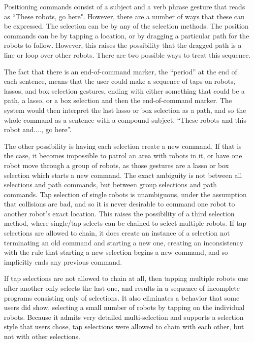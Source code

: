 Positioning commands consist of a subject and a verb phrase gesture that reads as ``These robots, go here". 
However, there are a number of ways that these can be expressed. 
The selection can be by any of the selection methods. 
The position commands can be by tapping a location, or by dragging a particular path for the robots to follow. 
However, this raises the possibility that the dragged path is a line or loop over other robots. 
There are two possible ways to treat this sequence. 

The fact that there is an end-of-command marker, the ``period'' at the end of each sentence, means that the user could make a sequence of taps on robots, lassos, and box selection gestures, ending with either something that could be a path, a lasso, or a box selection and then the end-of-command marker. 
The system would then interpret the last lasso or box selection as a path, and so the whole command as a sentence with a compound subject, ``These robots and this robot and...., go here''. 

The other possibility is having each selection create a new command. 
If that is the case, it becomes impossible to patrol an area with robots in it, or have one robot move through a group of robots, as those gestures are a lasso or box selection which starts a new command. 
The exact ambiguity is not between all selections and path commands, but between group selections and path commands.
Tap selection of single robots is unambiguous, under the assumption that collisions are bad, and so it is never desirable to command one robot to another robot's exact location. 
This raises the possibility of a third selection method, where single/tap selects can be chained to select multiple robots. 
If tap selections are allowed to chain, it does create an instance of a selection not terminating an old command and starting a new one, creating an inconsistency with the rule that starting a new selection begins a new command, and so implicitly ends any previous command.

If tap selections are not allowed to chain at all, then tapping multiple robots one after another only selects the last one, and results in a sequence of incomplete programs consisting only of selections. 
It also eliminates a behavior that some users did show, selecting a small number of robots by tapping on the individual robots. 
Because it admits very detailed multi-selection and supports a selection style that users chose, tap selections were allowed to chain with each other, but not with other selections. 

